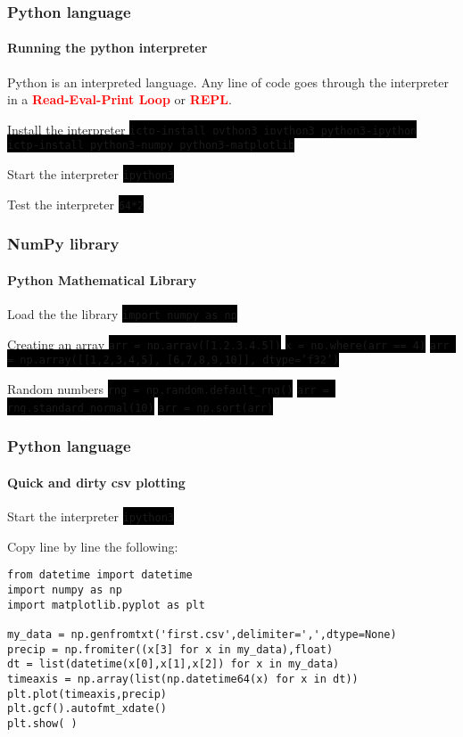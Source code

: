 \documentclass[unknownkeysallowed, 10pt, a4 paper, handout]{beamer}
\newcommand{\focus}[1]{\textbf{\textcolor{red}{#1}}}
\newcommand{\code}[1]{\colorbox{black}{\color{green}\texttt{#1}}}
\begin{document}
\begin{frame}
  \frametitle{Python language}
  \framesubtitle{Running the python interpreter}
  Python is an interpreted language. Any line of code goes through the
    interpreter in a \focus{Read-Eval-Print Loop} or \focus{REPL}.
  \begin{block}{Install the interpreter}
    \code{ictp-install python3 ipython3 python3-ipython} \\
    \code{ictp-install python3-numpy python3-matplotlib}
  \end{block}
  \begin{block}{Start the interpreter}
    \code{ipython3}
  \end{block}
  \begin{block}{Test the interpreter}
    \code{64*2}
  \end{block}
\end{frame}


\begin{frame}
  \frametitle{NumPy library}
  \framesubtitle{Python Mathematical Library}
  \begin{block}{Load the the library}
    \code{import numpy as np}
  \end{block}
  \begin{block}{Creating an array}
    \code{arr = np.array([1,2,3,4,5])}
    \code{x = np.where(arr == 4)}
    \code{arr = np.array([[1,2,3,4,5], [6,7,8,9,10]], dtype='f32')}
  \end{block}
  \begin{block}{Random numbers}
    \code{rng = np.random.default\_rng()}
    \code{arr = rng.standard\_normal(10)}
    \code{arr = np.sort(arr)}
  \end{block}
\end{frame}


\begin{frame}[fragile=singleslide]
  \frametitle{Python language}
  \framesubtitle{Quick and dirty csv plotting}
  \begin{block}{Start the interpreter}
    \code{ipython3}
  \end{block}
  \begin{exampleblock}{ }
    Copy line by line the following:
    \small{
    \begin{verbatim}
from datetime import datetime
import numpy as np
import matplotlib.pyplot as plt

my_data = np.genfromtxt('first.csv',delimiter=',',dtype=None)
precip = np.fromiter((x[3] for x in my_data),float)
dt = list(datetime(x[0],x[1],x[2]) for x in my_data)
timeaxis = np.array(list(np.datetime64(x) for x in dt))
plt.plot(timeaxis,precip)
plt.gcf().autofmt_xdate()
plt.show( )
    \end{verbatim}
    }
  \end{exampleblock}
\end{frame}
\end{document}
